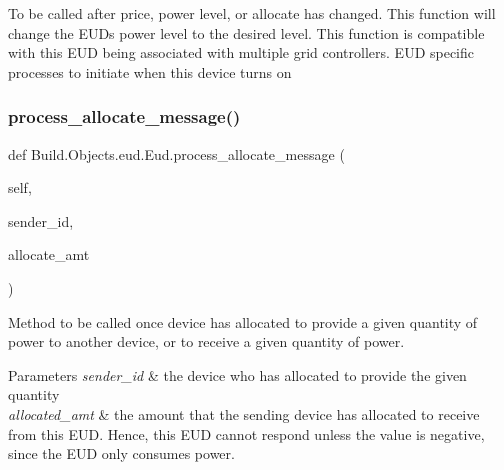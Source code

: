 To be called after price, power level, or allocate has changed. This function will change the E\+UD\textquotesingle{}s power level to the desired level. This function is compatible with this E\+UD being associated with multiple grid controllers. E\+UD specific processes to initiate when this device turns on \mbox{\label{class_build_1_1_objects_1_1eud_1_1_eud_af02e4338062f37389c04e87d9d5f9f63}} 
\subsubsection{\texorpdfstring{process\+\_\+allocate\+\_\+message()}{process\_allocate\_message()}}
{\footnotesize\ttfamily def Build.\+Objects.\+eud.\+Eud.\+process\+\_\+allocate\+\_\+message (\begin{DoxyParamCaption}\item[{}]{self,  }\item[{}]{sender\+\_\+id,  }\item[{}]{allocate\+\_\+amt }\end{DoxyParamCaption})}



Method to be called once device has allocated to provide a given quantity of power to another device, or to receive a given quantity of power. 


\begin{DoxyParams}{Parameters}
{\em sender\+\_\+id} & the device who has allocated to provide the given quantity \\
\hline
{\em allocated\+\_\+amt} & the amount that the sending device has allocated to receive from this E\+UD. Hence, this E\+UD cannot respond unless the value is negative, since the E\+UD only consumes power. \\
\hline
\end{DoxyParams}
\mbox{\label{class_build_1_1_objects_1_1eud_1_1_eud_a5105203c22df5b2e9c1754b8889563df}} 
